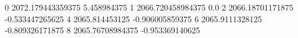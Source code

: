 0 2072.179443359375 5.458984375
1 2066.720458984375 0.0
2 2066.18701171875 -0.533447265625
4 2065.814453125 -0.906005859375
6 2065.9111328125 -0.809326171875
8 2065.76708984375 -0.953369140625
